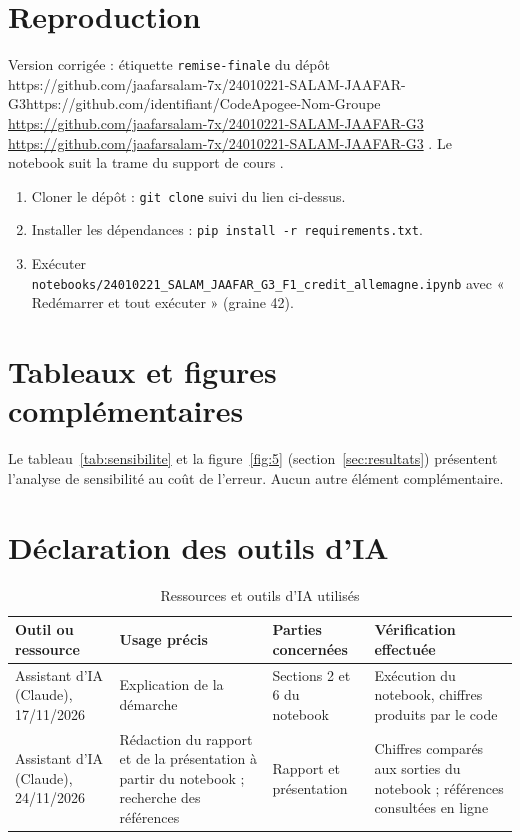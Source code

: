 \documentclass[11pt,a4paper]{article}
\newcounter{nbacompleter}
\newcommand{\lienDepot}{https://github.com/jaafarsalam-7x/24010221-SALAM-JAAFAR-G3}
\newcommand{\lienParDefaut}{https://github.com/identifiant/CodeApogee-Nom-Groupe}
\newcommand{\afficherlien}{%
  \ifx\lienDepot\lienParDefaut
    \stepcounter{nbacompleter}\textcolor{red}{\expandafter\url\expandafter{\lienDepot}}%
  \else
    \expandafter\url\expandafter{\lienDepot}%
  \fi}
\begin{document}
\section{Reproduction}
\label{ann:reproduction}
Version corrigée : étiquette \texttt{remise-finale} du dépôt \afficherlien. Le notebook suit la trame du support de cours \cite{support}.
\begin{enumerate}
  \item Cloner le dépôt : \texttt{git clone} suivi du lien ci-dessus.
  \item Installer les dépendances : \texttt{pip install -r requirements.txt}.
  \item Exécuter \texttt{notebooks/24010221\_SALAM\_JAAFAR\_G3\_F1\_credit\_allemagne.ipynb} avec « Redémarrer et tout exécuter » (graine 42).
\end{enumerate}

\section{Tableaux et figures complémentaires}
\label{ann:complements}
Le tableau~\ref{tab:sensibilite} et la figure~\ref{fig:5} (section~\ref{sec:resultats}) présentent l'analyse de sensibilité au coût de l'erreur. Aucun autre élément complémentaire.

\section{Déclaration des outils d'IA}
\label{ann:ia}
\begin{table}[htbp]
  \centering
  \caption{Ressources et outils d'IA utilisés}
  \label{tab:ia}
  \small
  \begin{tabular}{@{}P{3cm} P{4.8cm} P{3.3cm} P{4.4cm}@{}}
    \toprule
    Outil ou ressource & Usage précis & Parties concernées & Vérification effectuée \\
    \midrule
    Assistant d'IA (Claude), 17/11/2026 & Explication de la démarche & Sections 2 et 6 du notebook & Exécution du notebook, chiffres produits par le code \\
    Assistant d'IA (Claude), 24/11/2026 & Rédaction du rapport et de la présentation à partir du notebook ; recherche des références & Rapport et présentation & Chiffres comparés aux sorties du notebook ; références consultées en ligne \\
    \bottomrule
  \end{tabular}
\end{table}
\end{document}
